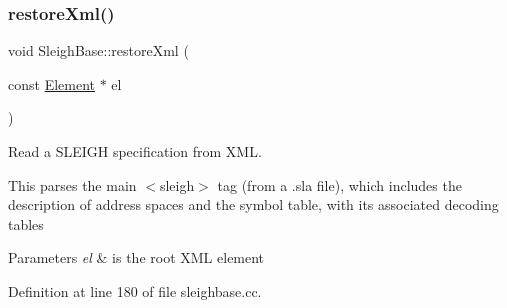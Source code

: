\subsubsection{\texorpdfstring{restoreXml()}{restoreXml()}}
{\footnotesize\ttfamily void Sleigh\+Base\+::restore\+Xml (\begin{DoxyParamCaption}\item[{const \mbox{\hyperlink{class_element}{Element}} $\ast$}]{el }\end{DoxyParamCaption})\hspace{0.3cm}{\ttfamily [protected]}}



Read a S\+L\+E\+I\+GH specification from X\+ML. 

This parses the main $<$sleigh$>$ tag (from a .sla file), which includes the description of address spaces and the symbol table, with its associated decoding tables 
\begin{DoxyParams}{Parameters}
{\em el} & is the root X\+ML element \\
\hline
\end{DoxyParams}


Definition at line 180 of file sleighbase.\+cc.

